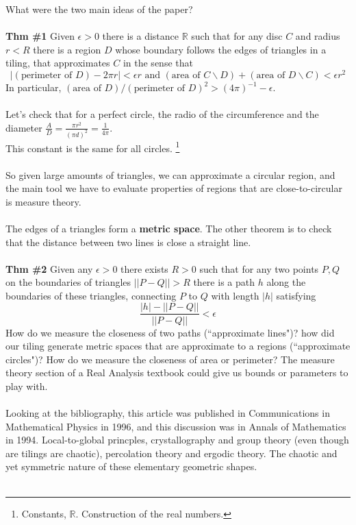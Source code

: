 \documentclass[12pt]{article}
\begin{document}
\newpage \noindent What were the two main ideas of the paper? \\ \\
\textbf{Thm \#1} Given $\epsilon > 0$ there is a distance $\mathbb{R}$ such that for any disc $C$ and radius $r < R$ there is a region $D$ whose boundary follows the edges of triangles in a tiling, that approximates $C$ in the sense that
$$ |(\text{perimeter of }D) - 2\pi r| < \epsilon r \text{ and }(\text{area of }C\backslash D) + (\text{area of }D\backslash C) < \epsilon r^2 $$
In particular, $(\text{area of }D)/(\text{perimeter of }D)^2 > (4\pi)^{-1} - \epsilon $. \\ \\
Let's check that for a perfect circle, the radio of the circumference and the diameter  $ \frac{A}{D} = \frac{\pi r^2}{(\pi d)^2} = \frac{1}{4\pi} $. \\ This constant is the same for all circles. \footnote{Constants, $\mathbb{R}$. Construction of the real numbers.}\\ \\ 
So given large amounts of triangles, we can approximate a circular region, and the main tool we have to evaluate properties of regions that are close-to-circular is {measure theory}. \\ \\
The edges of a triangles form a \textbf{metric space}.  The other theorem is to check that the distance between two lines is close a straight line. \\ \\
\textbf{Thm \#2} Given any $\epsilon > 0$ there exists $R > 0$ such that for any two points $P, Q$ on the boundaries of triangles $||P-Q|| > R$ there is a path $h$ along the boundaries of these triangles, connecting $P$ to $Q$ with length $|h|$ satisfying 
$$ \frac{|h| - ||P-Q||}{||P - Q||} < \epsilon  $$
How do we measure the closeness of two paths (``approximate lines")? how did our tiling generate metric spaces that are approximate to a regions (``approximate circles")?  How do we measure the closeness of area or perimeter?  The measure theory section of a Real Analysis textbook could give us bounds or parameters to play with. \\ \\
Looking at the bibliography, this article was published in Communications in Mathematical Physics in 1996, and this discussion was in Annals of Mathematics in 1994.  Local-to-global princples, crystallography and group theory (even though are tilings are chaotic), percolation theory and ergodic theory.  The chaotic and yet symmetric nature of these elementary geometric shapes. \\ \\
\end{document}
